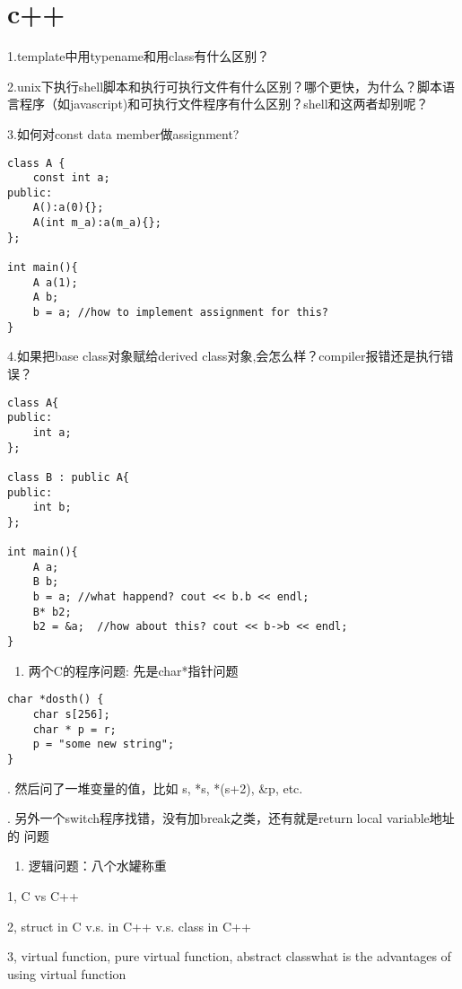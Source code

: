 \documentclass[12pt]{book}
\begin{document}
\chapter{c++}
\label{sec-11}
1.template中用typename和用class有什么区别？

2.unix下执行shell脚本和执行可执行文件有什么区别？哪个更快，为什么？脚本语言程序（如javascript)和可执行文件程序有什么区别？shell和这两者却别呢？

3.如何对const data member做assignment?
\lstset{language=java,label= ,caption= ,numbers=none}
\begin{lstlisting}
class A {
    const int a;
public:
    A():a(0){};
    A(int m_a):a(m_a){};
};

int main(){
    A a(1);
    A b;
    b = a; //how to implement assignment for this?
}
\end{lstlisting}

4.如果把base class对象赋给derived class对象,会怎么样？compiler报错还是执行错
误？
\lstset{language=java,label= ,caption= ,numbers=none}
\begin{lstlisting}
class A{
public:
    int a;
};

class B : public A{
public:
    int b;
};

int main(){
    A a;
    B b;
    b = a; //what happend? cout << b.b << endl;    
    B* b2;
    b2 = &a;  //how about this? cout << b->b << endl; 
}
\end{lstlisting}

\begin{enumerate}
\item 两个C的程序问题: 先是char*指针问题
\end{enumerate}
\lstset{language=java,label= ,caption= ,numbers=none}
\begin{lstlisting}
char *dosth() {
    char s[256];
    char * p = r;
    p = "some new string";
}
\end{lstlisting}

. 然后问了一堆变量的值，比如 s, *s, *(s+2), \&p, etc.

. 另外一个switch程序找错，没有加break之类，还有就是return local variable地址的
问题

\begin{enumerate}
\item 逻辑问题：八个水罐称重
\end{enumerate}

1, C vs C++

2, struct in C v.s. in C++ v.s. class in C++

3, virtual function, pure virtual function, abstract classwhat is the advantages of using virtual function
\end{document}

